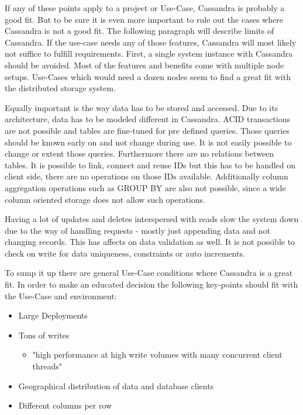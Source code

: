 If any of these points apply to a project or Use-Case, Cassandra is probably a good fit.
But to be sure it is even more important to rule out the cases where Cassandra is not a good fit.
The following paragraph will describe limits of Cassandra. If the use-case needs any of those features, Cassandra will most likely not suffice to fulfill requirements.
First, a single system instance with Cassandra should be avoided. Most of the features and benefits come with multiple node setups. Use-Cases which would need a dozen nodes seem to find a great fit with the distributed storage system.

Equally important is the way data has to be stored and accessed. Due to its architecture, data has to be modeled different in Cassandra. ACID transactions are not possible and tables are fine-tuned for pre defined queries. Those queries should be known early on and not change during use. It is not easily possible to change or extent those queries. Furthermore there are no relations between tables. It is possible to link, connect and reuse IDs but this has to be handled on client side, there are no operations on those IDs available. Additionally column aggregation operations such as GROUP BY are also not possible, since a wide column oriented storage does not allow such operations.

Having a lot of updates and deletes interspersed with reads slow the system down due to the way of handling requests - mostly just appending data and not changing records. This has affects on data validation as well. It is not possible to check on write for data uniqueness, constraints or auto increments. 

To sump it up there are general Use-Case conditions where Cassandra is a great fit.
In order to make an educated decision the following key-points should fit with the Use-Case and environment:
\begin{itemize}
    \item Large Deployments
    \item Tons of writes
    \begin{itemize}
        \item{"high performance at high write volumes with many concurrent client threads"}
    \end{itemize}
    \item Geographical distribution of data and database clients
    \item Different columns per row
\end{itemize}


